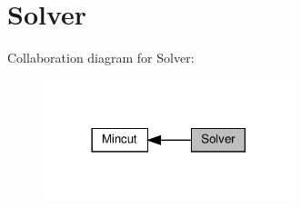 \hypertarget{group__group__mincut__solver}{}\section{Solver}
\label{group__group__mincut__solver}
Collaboration diagram for Solver\+:
\nopagebreak
\begin{figure}[H]
\begin{center}
\leavevmode
\includegraphics[width=206pt]{group__group__mincut__solver}
\end{center}
\end{figure}

